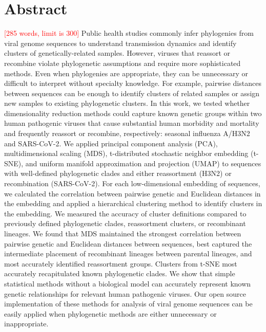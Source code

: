\documentclass[10pt,letterpaper]{article}
\def\jhc#1{\textcolor{red}{[#1]}}
\begin{document}
\section*{Abstract}
\jhc{285 words, limit is 300}
Public health studies commonly infer phylogenies from viral genome sequences to understand transmission dynamics and identify clusters of genetically-related samples.
However, viruses that reassort or recombine violate phylogenetic assumptions and require more sophisticated methods.
Even when phylogenies are appropriate, they can be unnecessary or difficult to interpret without specialty knowledge.
For example, pairwise distances between sequences can be enough to identify clusters of related samples or assign new samples to existing phylogenetic clusters.
In this work, we tested whether dimensionality reduction methods could capture known genetic groups within two human pathogenic viruses that cause substantial human morbidity and mortality and frequently reassort or recombine, respectively: seasonal influenza A/H3N2 and SARS-CoV-2.
We applied principal component analysis (PCA), multidimensional scaling (MDS), t-distributed stochastic neighbor embedding (t-SNE), and uniform manifold approximation and projection (UMAP) to sequences with well-defined phylogenetic clades and either reassortment (H3N2) or recombination (SARS-CoV-2).
For each low-dimensional embedding of sequences, we calculated the correlation between pairwise genetic and Euclidean distances in the embedding and applied a hierarchical clustering method to identify clusters in the embedding.
We measured the accuracy of cluster definitions compared to previously defined phylogenetic clades, reassortment clusters, or recombinant lineages.
We found that MDS maintained the strongest correlation between pairwise genetic and Euclidean distances between sequences, best captured the intermediate placement of recombinant lineages between parental lineages, and most accurately identified reassortment groups.
Clusters from t-SNE most accurately recapitulated known phylogenetic clades.
We show that simple statistical methods without a biological model can accurately represent known genetic relationships for relevant human pathogenic viruses.
Our open source implementation of these methods for analysis of viral genome sequences can be easily applied when phylogenetic methods are either unnecessary or inappropriate.

\end{document}
